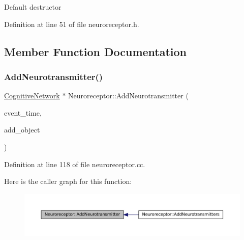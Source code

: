 Default destructor 

Definition at line 51 of file neuroreceptor.\+h.



\subsection{Member Function Documentation}
\mbox{\label{class_neuroreceptor_a900b21f6feb6334d4ff8a3fd5244bf05}} 
\subsubsection{\texorpdfstring{Add\+Neurotransmitter()}{AddNeurotransmitter()}}
{\footnotesize\ttfamily \mbox{\hyperlink{class_cognitive_network}{Cognitive\+Network}} $\ast$ Neuroreceptor\+::\+Add\+Neurotransmitter (\begin{DoxyParamCaption}\item[{std\+::chrono\+::time\+\_\+point$<$ \mbox{\hyperlink{universe_8h_a0ef8d951d1ca5ab3cfaf7ab4c7a6fd80}{Clock}} $>$}]{event\+\_\+time,  }\item[{\mbox{\hyperlink{class_cognitive_network}{Cognitive\+Network}} $\ast$}]{add\+\_\+object }\end{DoxyParamCaption})}



Definition at line 118 of file neuroreceptor.\+cc.

Here is the caller graph for this function\+:\nopagebreak
\begin{figure}[H]
\begin{center}
\leavevmode
\includegraphics[width=350pt]{class_neuroreceptor_a900b21f6feb6334d4ff8a3fd5244bf05_icgraph}
\end{center}
\end{figure}
\mbox{\label{class_neuroreceptor_a2e4cbd9debd555091923f57f8aa11fe4}} 
